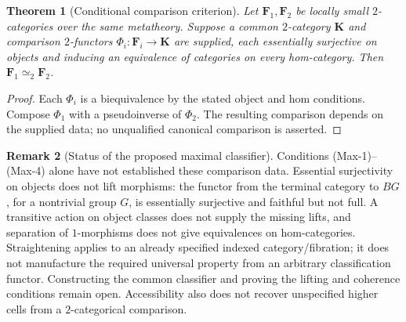 \documentclass[11pt]{article}
\theoremstyle{plain}
\newtheorem{theorem}{Theorem}[section]
\theoremstyle{definition}
\newtheorem{remark}[theorem]{Remark}
\begin{document}
\begin{theorem}[Conditional comparison criterion]\label{thm:meta-cat}
Let $\mathbf F_1,\mathbf F_2$ be locally small $2$-categories over the same
metatheory. Suppose a common $2$-category $\mathbf K$ and comparison
$2$-functors $\Phi_i:\mathbf F_i\to\mathbf K$ are supplied, each essentially
surjective on objects and inducing an equivalence of categories on every
hom-category. Then $\mathbf F_1\simeq_2\mathbf F_2$.
\end{theorem}
\begin{proof}
Each $\Phi_i$ is a biequivalence by the stated object and hom conditions.
Compose $\Phi_1$ with a pseudoinverse of $\Phi_2$. The resulting comparison
depends on the supplied data; no unqualified canonical comparison is asserted.
\end{proof}

\begin{remark}[Status of the proposed maximal classifier]
Conditions (Max-1)--(Max-4) alone have not established these comparison data.
Essential surjectivity on objects does not lift morphisms: the functor from
the terminal category to $BG$, for a nontrivial group $G$, is essentially
surjective and faithful but not full. A transitive action on object classes
does not supply the missing lifts, and separation of $1$-morphisms does not
give equivalences on hom-categories. Straightening applies to an already
specified indexed category/fibration; it does not manufacture the required
universal property from an arbitrary classification functor. Constructing
the common classifier and proving the lifting and coherence conditions
remain open. Accessibility also does not recover unspecified higher cells
from a $2$-categorical comparison.
\end{remark}
\end{document}
